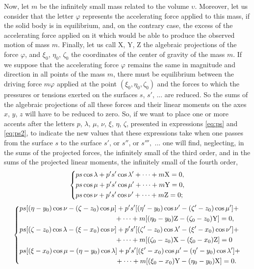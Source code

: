 \documentclass[leqno,openright,smallroyalvopaper,8pt,twoside,showtrims]{memoir}
\begin{document}
Now, let $m$ be the infinitely small mass related to the volume $\upsilon$. Moreover, let us consider that the letter $\varphi$ represents the accelerating force applied to this mass, if the solid body is in equilibrium, and, on the contrary case, the excess of the accelerating force applied on it which would be able to produce the observed motion of mass $m$. Finally, let us call X, Y, Z the algebraic projections of the force $\varphi$, and $\xi_0$, $\eta_0$, $\zeta_0$ the coordinates of the center of gravity of the mass $m$. If we suppose that the accelerating force $\varphi$ remains the same in magnitude and direction in all points of the mass $m$, there must be equilibrium between the driving force $m\varphi$ applied at the point $(\xi_0,\eta_0,\zeta_0)$ and the forces to which the pressures or tensions exerted on the surfaces $s$, $s'$, ... are reduced. So the sums of the algebraic projections of all these forces and their linear moments on the axes $x$, $y$, $z$ will have to be reduced to zero. So, if we want to place one or more accents after the letters $p$, $\lambda$, $\mu$, $\nu$, $\xi$, $\eta$, $\zeta$, presented in expressions \eqref{eq:ps} and \eqref{eq:ps2}, to indicate the new values that these expressions take when one passes from the surface $s$ to the surface $s'$, or $s''$, or $s''',$ ... one will find, neglecting, in the sums of the projected forces, the infinitely small of the third order, and in the sums of the projected linear moments, the infinitely small of the fourth order,
 \begin{equation}
   \begin{dcases}
        ps\cos\lambda+p's'\cos\lambda'+\cdots+m\text{X}=0,\\
       ps\cos\mu+p's'\cos\mu'+\cdots+m\text{Y}=0,\\
        ps\cos\nu+p's'\cos\nu'+\cdots+m\text{Z}=0;
   \end{dcases}
 \end{equation}
 \begin{equation}
   \begin{dcases}
   \begin{aligned}
        ps[(\eta-y_0)\cos\nu-(\zeta-z_0)\cos\mu&]+p's'[(\eta'-y_0)\cos\nu'-(\zeta'-z_0)\cos\mu']+\\
        &+\cdots+m[(\eta_0-y_0)\text{Z}-(\zeta_0-z_0)\text{Y}]=0,
   \end{aligned}\\
         \begin{aligned}
        ps[(\zeta-z_0)\cos\lambda-(\xi-x_0)\cos\nu&]+p's'[(\zeta'-z_0)\cos\lambda'-(\xi'-x_0)\cos\nu']+\\
        &+\cdots+m[(\zeta_0-z_0)\text{X}-(\xi_0-x_0)\text{Z}]=0
   \end{aligned}\\
         \begin{aligned}
        ps[(\xi-x_0)\cos\mu-(\eta-y_0)\cos\lambda&]+p's'[(\xi'-x_0)\cos\mu'-(\eta'-y_0)\cos\lambda']+\\
        &+\cdots+m[(\xi_0-x_0)\text{Y}-(\eta_0-y_0)\text{X}]=0.
   \end{aligned}
   \end{dcases}
 \end{equation}
\end{document}
